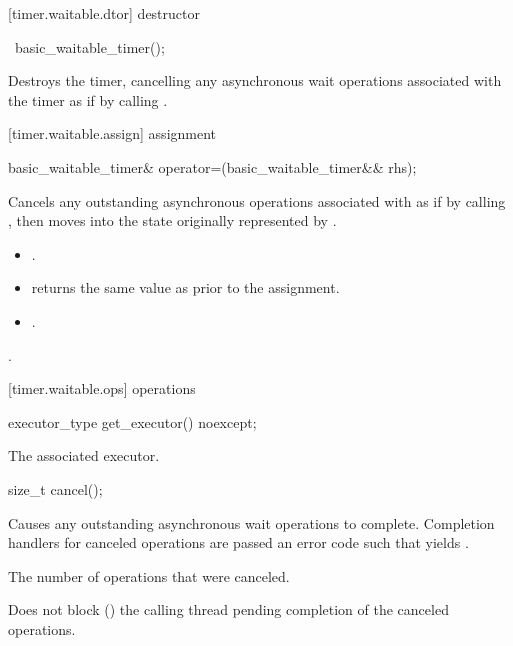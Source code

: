 [timer.waitable.dtor]{ destructor}

\begin{itemdecl}
~basic_waitable_timer();
\end{itemdecl}

\begin{itemdescr}
\pnum
\effects Destroys the timer, cancelling any asynchronous wait operations associated with the timer as if by calling .
\end{itemdescr}



[timer.waitable.assign]{ assignment}

\begin{itemdecl}
basic_waitable_timer& operator=(basic_waitable_timer&& rhs);
\end{itemdecl}

\begin{itemdescr}
\pnum
\effects Cancels any outstanding asynchronous operations associated with  as if by calling , then moves into  the state originally represented by .

\pnum
\postconditions 
\begin{itemize}
\item
{}.
\item
{} returns the same value as  prior to the assignment.
\item
{}.
\end{itemize}

\pnum
\returns {}.
\end{itemdescr}



[timer.waitable.ops]{ operations}

\begin{itemdecl}
executor_type get_executor() noexcept;
\end{itemdecl}

\begin{itemdescr}
\pnum
\returns The associated executor.
\end{itemdescr}

\begin{itemdecl}
size_t cancel();
\end{itemdecl}

\begin{itemdescr}
\pnum
\effects Causes any outstanding asynchronous wait operations to complete. Completion handlers for canceled operations are passed an error code  such that  yields .

\pnum
\returns The number of operations that were canceled.

\pnum
\remarks Does not block () the calling thread pending completion of the canceled operations.
\end{itemdescr}

